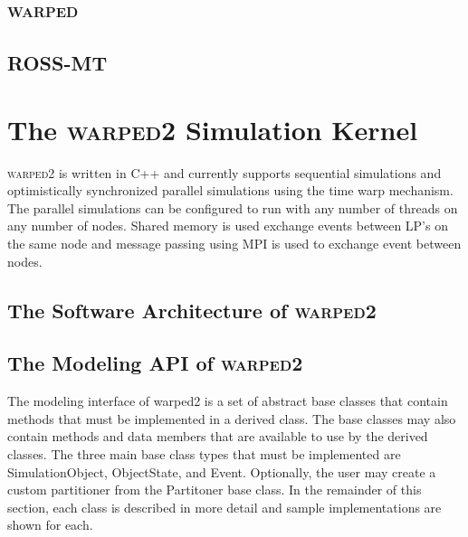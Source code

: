 \documentclass[11pt]{book}
\begin{document}

\section{\textsc{warped}}


\section{ROSS-MT}


\chapter{The \textsc{warped2} Simulation Kernel}\label{warped2_overview}

\textsc{warped2} is written in C++ and currently supports sequential simulations and optimistically 
synchronized parallel simulations using the time warp mechanism. The parallel simulations can be
configured to run with any number of threads on any number of nodes. Shared memory is used exchange
events between LP’s on the same node and message passing using MPI is used to exchange event between
nodes.


\section{The Software Architecture of \textsc{warped2}}


\section{The Modeling API of \textsc{warped2}}

The modeling interface of warped2 is a set of abstract base classes that contain methods
that must be implemented in a derived class. The base classes may also contain methods and data
members that are available to use by the derived classes. The three main base class types that must
be implemented are SimulationObject, ObjectState, and Event. Optionally, the user may create a
custom partitioner from the Partitoner base class. In the remainder of this section, each class
is described in more detail and sample implementations are shown for each.
\end{document}
